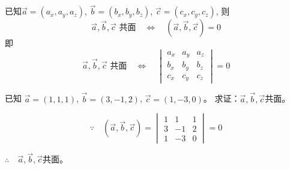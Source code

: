 已知$\vec{a}=(a_x,a_y,a_z)$, $\vec{b}=(b_x,b_y,b_z)$, $\vec{c}=(c_x,c_y,c_z)$, 则
\[\vec{a}, \vec{b}, \vec{c}\text{ 共面} \quad \Longleftrightarrow \quad  (\vec{a}, \vec{b}, \vec{c})=0\]
即
\[\vec{a}, \vec{b}, \vec{c}\text{ 共面} \quad \Longleftrightarrow \quad \begin{vmatrix}
    a_x&a_y&a_z\\b_x&b_y&b_z\\c_x&c_y&c_z
\end{vmatrix}=0\]

\begin{example}
    已知 $\vec{a}=(1,1,1)$, $\vec{b}=(3,-1,2)$, 
$\vec{c}=(1,-3,0)$。
求证：$\vec{a},\vec{b},\vec{c}$共面。
\end{example}

\begin{solution}
\[\because\quad (\vec{a},\vec{b},\vec{c})=\begin{vmatrix}
    1&1&1\\3&-1&2\\1&-3&0
\end{vmatrix}=0\]

$\therefore\quad \vec{a},\vec{b},\vec{c}$共面。
\end{solution}


